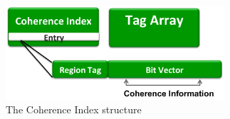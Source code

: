 \begin{figure}[h]
  \centering
  \includegraphics[width=3.2in]{figures/ci.pdf}
  \caption{The Coherence Index structure}
  \label{fig:ci}
\end{figure}
